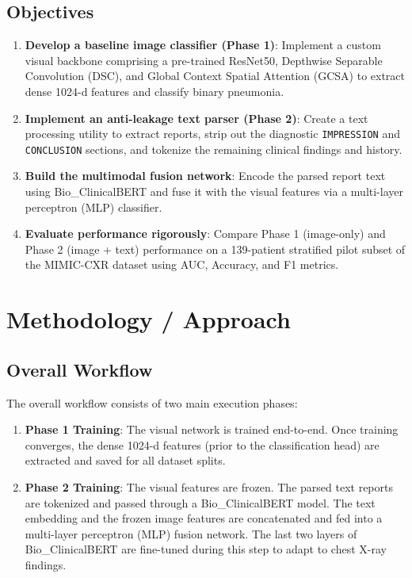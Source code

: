 \documentclass[11pt,a4paper]{article}
\begin{document}
\subsection{Objectives}
\begin{enumerate}
    \item \textbf{Develop a baseline image classifier (Phase 1)}: Implement a custom visual backbone comprising a pre-trained ResNet50, Depthwise Separable Convolution (DSC), and Global Context Spatial Attention (GCSA) to extract dense 1024-d features and classify binary pneumonia.
    \item \textbf{Implement an anti-leakage text parser (Phase 2)}: Create a text processing utility to extract reports, strip out the diagnostic \texttt{IMPRESSION} and \texttt{CONCLUSION} sections, and tokenize the remaining clinical findings and history.
    \item \textbf{Build the multimodal fusion network}: Encode the parsed report text using Bio\_ClinicalBERT and fuse it with the visual features via a multi-layer perceptron (MLP) classifier.
    \item \textbf{Evaluate performance rigorously}: Compare Phase 1 (image-only) and Phase 2 (image + text) performance on a 139-patient stratified pilot subset of the MIMIC-CXR dataset using AUC, Accuracy, and F1 metrics.
\end{enumerate}

\section{Methodology / Approach} \label{sec:methodology}

\subsection{Overall Workflow}
The overall workflow consists of two main execution phases:
\begin{enumerate}
    \item \textbf{Phase 1 Training}: The visual network is trained end-to-end. Once training converges, the dense 1024-d features (prior to the classification head) are extracted and saved for all dataset splits.
    \item \textbf{Phase 2 Training}: The visual features are frozen. The parsed text reports are tokenized and passed through a Bio\_ClinicalBERT model. The text embedding and the frozen image features are concatenated and fed into a multi-layer perceptron (MLP) fusion network. The last two layers of Bio\_ClinicalBERT are fine-tuned during this step to adapt to chest X-ray findings.
\end{enumerate}
\end{document}
